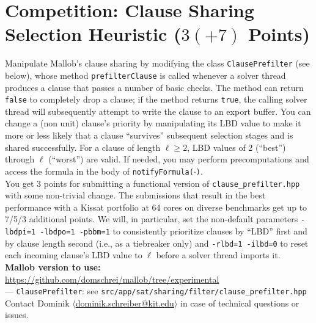\documentclass[a4paper]{article}
\begin{document}

\newcommand{\statetilled}{T}
\newcommand{\statetobetilled}{$+$}
\newcommand{\statenottobetilled}{$-$}


\section{Competition: Clause Sharing Selection Heuristic ($3 (+7)$ Points)}

Manipulate Mallob's clause sharing by modifying the class \texttt{ClausePrefilter} (see below), whose method \texttt{prefilterClause} is called whenever a solver thread produces a clause that passes a number of basic checks.
The method can return \texttt{false} to completely drop a clause;
if the method returns \texttt{true}, the calling solver thread will subsequently attempt to write the clause to an export buffer.
You can change a (non unit) clause's priority by manipulating its LBD value to make it more or less likely that a clause ``survives'' subsequent selection stages and is shared successfully.
For a clause of length $\ell \geq 2$, LBD values of 2 (``best'') through $\ell$ (``worst'') are valid.
If needed, you may perform precomputations and access the formula in the body of \texttt{notifyFormula($\cdot$)}.
\\[1em]
You get 3 points for submitting a functional version of \texttt{clause\_prefilter.hpp} with some non-trivial change.
The submissions that result in the best performance with a Kissat portfolio at 64 cores on diverse benchmarks get up to 7/5/3 additional points.
We will, in particular, set the non-default parameters \texttt{-lbdpi=1 -lbdpo=1 -pbbm=1} to consistently prioritize clauses by ``LBD'' first and by clause length second (i.e., as a tiebreaker only) and \texttt{-rlbd=1 -ilbd=0} to reset each incoming clause's LBD value to $\ell$ before a solver thread imports it.
\\[1em]
\textbf{Mallob version to use:} \url{https://github.com/domschrei/mallob/tree/experimental}
\\
--- \texttt{ClausePrefilter}: see \texttt{src/app/sat/sharing/filter/clause\_prefilter.hpp}
\\[1em]
Contact Dominik $\langle$\href{mailto:dominik.schreiber@kit.edu}{dominik.schreiber@kit.edu}$\rangle$ in case of technical questions or issues.

\end{document}
